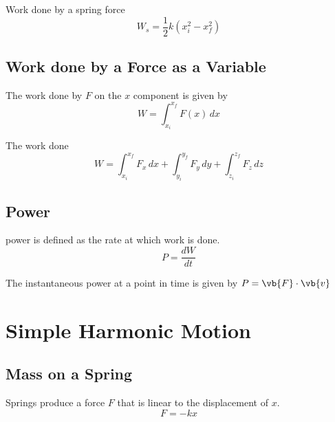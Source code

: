 \documentclass[a4paper]{article}
\begin{document}
\begin{thm}{}{} Work done by a spring force $$W_s=\frac{1}{2}k(x_i^2-x_f^2)$$
\end{thm}

\subsection{Work done by a Force as a Variable}
\begin{defn}{}{} The work done by $F$ on the $x$ component is given by $$W=\int_{x_i}^{x_f}F(x)\,dx$$
\end{defn}

\begin{thm}{}{} The work done $$W=\int_{x_i}^{x_f}F_x\,dx+\int_{y_i}^{y_f}F_y\,dy+\int_{z_i}^{z_f}F_z\,dz$$
\end{thm}

\subsection{Power}
\begin{defn}{}{} power is defined as the rate at which work is done. $$P=\frac{dW}{dt}$$
\end{defn}

\begin{defn}{}{} The instantaneous power at a point in time is given by $P=\vb{F}\cdot\vb{v}$
\end{defn}

\pagebreak
\section{Simple Harmonic Motion}
\subsection{Mass on a Spring}
\begin{thm}{}{} Springs produce a force $F$ that is linear to the displacement of $x$. $$F=-kx$$
\end{thm}
\end{document}
